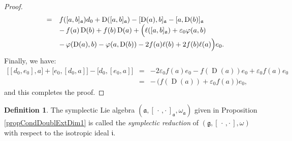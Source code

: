 \documentclass[final,1p,times,nopreprintline]{elsarticle}
\theoremstyle{definition}
\newtheorem{definition}{Definition}[section]
\numberwithin{equation}{section}
\newcommand{\w}{\omega}
\newcommand{\g}{\mathfrak{g}}
\newcommand{\ai}{\mathfrak{a}}
\numberwithin{equation}{section}
\newcommand{\D}{\operatorname{D}}
\begin{document}
\begin{proof}
\begin{equation*}
\begin{array}{r c l}
		&=&f([a,b]_\ai)d_0+\D([a,b]_\ai)-[\D(a),b]_\ai-[a,\D(b)]_\ai\\\vspace{0.75mm}
		&&-\,f(a)\D(b)+f(b)\D(a)+\Big(\ell([a,b]_\ai)+\varepsilon_0\varphi(a,b)\\
		&&-\,\varphi(\D(a),b)-\varphi(a,\D(b))-2f(a)\ell(b)+2f(b)\ell(a)\Big)e_0.
		\end{array}
	\end{equation*}
	Finally, we have:
	\begin{eqnarray*}
		\big[[d_0,e_0],a\big]+\big[e_0,[d_0,a]\big]-\big[d_0,[e_0,a]\big]&=&-2\varepsilon_0f(a)e_0-f(\D(a))e_0+\varepsilon_0f(a)e_0\\
		&=&-\,\Big(f(\D(a))+\varepsilon_0f(a)\Big)e_0,
	\end{eqnarray*}
and this completes the proof.\vspace{1mm}
\end{proof}

\begin{definition}
	The symplectic Lie algebra $(\ai,[\,\cdot\,,\cdot\,]_\ai,\w_\ai)$ given in Proposition \ref{propCondDoublExtDim1} is called the \textit{symplectic reduction} of $(\g,[\,\cdot\,,\cdot\,],\w)$ with respect to the isotropic ideal $\mathfrak{i}$.
\end{definition}
\end{document}
